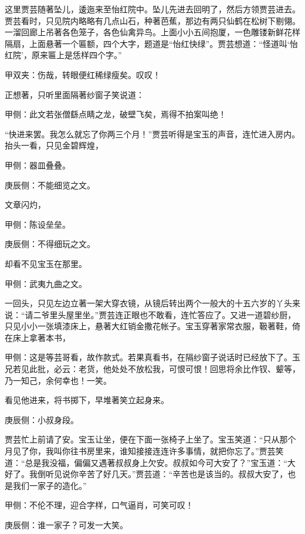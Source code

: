 \begin{parag}
    这里贾芸随著坠儿，逶迤来至怡红院中。坠儿先进去回明了，然后方领贾芸进去。贾芸看时，只见院内略略有几点山石，种著芭蕉，那边有两只仙鹤在松树下剔翎。一溜回廊上吊著各色笼子，各色仙禽异鸟。上面小小五间抱厦，一色雕镂新鲜花样隔扇，上面悬著一个匾额，四个大字，题道是“怡红快绿”。贾芸想道：“怪道叫‘怡红院’，原来匾上是恁样四个字。”\begin{note}甲双夹：伤哉，转眼便红稀绿瘦矣。叹叹！\end{note}正想著，只听里面隔著纱窗子笑说道：\begin{note}甲侧：此文若张僧繇点睛之龙，破壁飞矣，焉得不拍案叫绝！\end{note}“快进来罢。我怎么就忘了你两三个月！”贾芸听得是宝玉的声音，连忙进入房内。抬头一看，只见金碧辉煌，\begin{note}甲侧：器皿叠叠。\end{note}\begin{note}庚辰侧：不能细览之文。\end{note}文章闪灼，\begin{note}甲侧：陈设垒垒。\end{note}\begin{note}庚辰侧：不得细玩之文。\end{note}却看不见宝玉在那里。\begin{note}甲侧：武夷九曲之文。\end{note}一回头，只见左边立著一架大穿衣镜，从镜后转出两个一般大的十五六岁的丫头来说：“请二爷里头屋里坐。”贾芸连正眼也不敢看，连忙答应了。又进一道碧纱厨，只见小小一张填漆床上，悬著大红销金撒花帐子。宝玉穿著家常衣服，靸著鞋，倚在床上拿著本书，\begin{note}甲侧：这是等芸哥看，故作款式。若果真看书，在隔纱窗子说话时已经放下了。玉兄若见此批，必云：老货，他处处不放松我，可恨可恨！回思将余比作钗、颦等，乃一知己，余何幸也！一笑。\end{note}看见他进来，将书掷下，早堆著笑立起身来。\begin{note}庚辰侧：小叔身段。\end{note}贾芸忙上前请了安。宝玉让坐，便在下面一张椅子上坐了。宝玉笑道：“只从那个月见了你，我叫你往书房里来，谁知接接连连许多事情，就把你忘了。”贾芸笑道：“总是我没福，偏偏又遇著叔叔身上欠安。叔叔如今可大安了？”宝玉道：“大好了。我倒听见说你辛苦了好几天。”贾芸道：“辛苦也是该当的。叔叔大安了，也是我们一家子的造化。”\begin{note}甲侧：不伦不理，迎合字样，口气逼肖，可笑可叹！\end{note}\begin{note}庚辰侧：谁一家子？可发一大笑。\end{note}
\end{parag}



